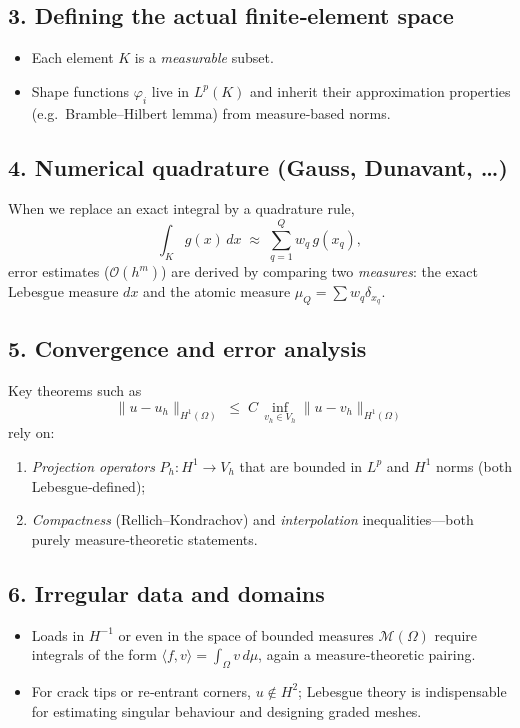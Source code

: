 \documentclass[12pt]{article}
\theoremstyle{definition} %
\theoremstyle{plain} %
\begin{document}
\subsection*{3.  Defining the actual finite‑element space}
\begin{itemize}
	\item Each element \(K\) is a \emph{measurable} subset.
	\item Shape functions $\varphi_i$ live in $L^p(K)$ and inherit their
	      approximation properties (e.g.\ Bramble–Hilbert lemma) from
	      measure‑based norms.
\end{itemize}

\subsection*{4.  Numerical quadrature (Gauss, Dunavant, \dots)}
When we replace an exact integral by a quadrature rule,
\[
	\int_K g(x)\,dx \;\approx\; \sum_{q=1}^Q w_q\,g(x_q),
\]
error estimates ($\mathcal{O}(h^{m})$) are derived by comparing two \emph{measures}:
the exact Lebesgue measure $dx$ and the atomic measure
$\mu_Q=\sum w_q\delta_{x_q}$.

\subsection*{5.  Convergence and error analysis}
Key theorems such as
\[
	\|u - u_h\|_{H^1(\Omega)}
	\;\le\; C\,\inf_{v_h\in V_h}\|u-v_h\|_{H^1(\Omega)}
\]
rely on:
\begin{enumerate}
	\item \emph{Projection operators} $P_h:H^1\to V_h$ that are bounded in
	      $L^p$ and $H^1$ norms (both Lebesgue‑defined);
	\item \emph{Compactness} (Rellich–Kondrachov) and \emph{interpolation}
	      inequalities—both purely measure‑theoretic statements.
\end{enumerate}

\subsection*{6.  Irregular data and domains}
\begin{itemize}
	\item Loads in $H^{-1}$ or even in the space of bounded measures
	      $\mathcal{M}(\Omega)$ require integrals of the form
	      $\langle f, v\rangle = \int_\Omega v\,d\mu$, again a
	      measure‑theoretic pairing.
	\item For crack tips or re‑entrant corners, $u\notin H^2$; Lebesgue
	      theory is indispensable for estimating singular
	      behaviour and designing graded meshes.
\end{itemize}
\end{document}
